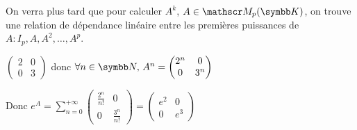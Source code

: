 
\begin{remarque}
On verra plus tard que pour calculer $A^k$, $A \in \mathscr M_p(\K)$, on trouve une relation de
dépendance linéaire entre les premières puissances de $A: I_p, A, A^2, \dots, A^p$.
\end{remarque}

\begin{exemple}
    $\begin{pmatrix}
        2 & 0 \\
        0 & 3
    \end{pmatrix}$ donc $\forall n \in \N, \, A^n = \begin{pmatrix}
        2^n & 0 \\
        0 & 3^n
    \end{pmatrix}$

    Donc $\displaystyle e^A = \sum_{n = 0}^{+\infty} \begin{pmatrix}
        \frac{2^n}{n!} & 0 \\
        0 & \frac{3^n}{n!}
    \end{pmatrix} = \begin{pmatrix}
        e^2 & 0 \\
        0 & e^3
    \end{pmatrix}$ \\
\end{exemple}

